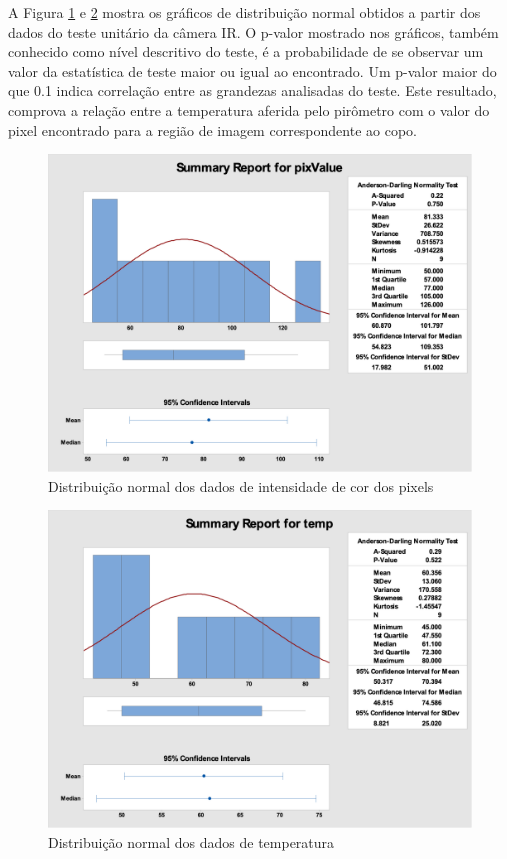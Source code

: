 		
		A Figura \ref{fig:pvalue_pixvalue} e \ref{fig:pvalue_temp} mostra os gráficos de distribuição normal obtidos a partir dos dados do teste unitário da câmera IR. O p-valor mostrado nos gráficos,  também conhecido como nível descritivo do teste, é a probabilidade de se observar um valor da estatística de teste maior ou igual ao encontrado. Um p-valor maior do que 0.1 indica correlação entre as grandezas analisadas do teste. Este resultado, comprova a relação entre a temperatura aferida pelo pirômetro com o valor do pixel encontrado para a região de imagem correspondente ao copo.
		
		\begin{figure}[!ht]
		   \centering
		   \includegraphics[width=12cm]{Figures/pvalue-pixvalue.png}
		   \caption{Distribuição normal dos dados de intensidade de cor dos pixels}
		   \label{fig:pvalue_pixvalue}
		\end{figure}
		
		\begin{figure}[!ht]
		   \centering
		   \includegraphics[width=12cm]{Figures/pvalue-temp.png}
		   \caption{Distribuição normal dos dados de temperatura}
		   \label{fig:pvalue_temp}
		\end{figure}
		
